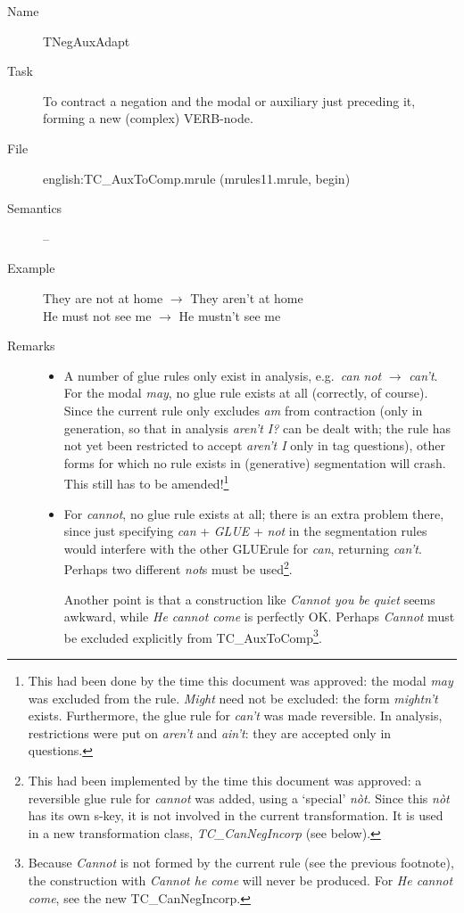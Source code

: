 \begin{description}
\vspace{1 cm}
\begin{description}
\item[Name] TNegAuxAdapt
\item[Task] To contract a negation and the modal or auxiliary just preceding 
it, forming a new (complex) VERB-node.
\item[File] english:TC\_AuxToComp.mrule (mrules11.mrule, begin)
\item[Semantics] --
\item[Example] They are not at home $\rightarrow$ They aren't at home\\
He must not see me $\rightarrow$ He mustn't see me
\item[Remarks] \mbox{}
\begin{itemize}
\item A number of glue rules only exist in analysis, e.g.\ {\em can not\/} 
$\rightarrow$ {\em can't\/}. For 
the modal {\em may\/}, no glue rule exists at all (correctly, of course).
Since the
current rule only excludes {\em am\/} from contraction (only in generation, so 
that in analysis {\em aren't I?\/} can be dealt with; the rule has not yet been 
restricted to accept {\em aren't I\/} only in tag questions), 
other forms for which 
no rule exists in (generative) segmentation will crash. This still has to be 
amended!\footnote{This had been done by the time this document was approved: 
the modal {\em may\/} was excluded from the rule. {\em Might\/} need not be 
excluded: the form {\em mightn't\/} exists. Furthermore, the glue rule for {\em 
can't\/} was made reversible. In analysis, restrictions were put on {\em aren't 
} and {\em ain't\/}: they are accepted only in questions.}
\item For {\em cannot\/}, no glue rule exists at all; there is an extra problem 
there, since just specifying {\em can\/} + {\em GLUE\/} + {\em not\/} in the 
segmentation rules would interfere with the other GLUErule for {\em can\/}, 
returning {\em can't\/}. Perhaps two different {\em not\/}s must be 
used\footnote{This had been implemented by the time this document was 
approved: a reversible
glue rule for {\em cannot\/} was added, using a `special' {\em n\`{o}t\/}. 
Since this {\em n\`{o}t\/} has its own s-key, it is not involved in the current 
transformation. It is used in a new transformation class, {\em 
TC\_CanNegIncorp\/} (see below).}.

Another point is that a construction like {\em Cannot you be quiet\/} seems 
awkward, 
while {\em He cannot come\/} is perfectly OK. Perhaps {\em Cannot\/} must be 
excluded explicitly from TC\_AuxToComp\footnote{Because {\em Cannot\/} is not 
formed by the current rule (see the previous footnote), the construction with {
\em Cannot he come\/} will never be produced. For {\em He cannot come\/}, 
see the new TC\_CanNegIncorp.}.
\end{itemize}
\end{description}

\end{description}

